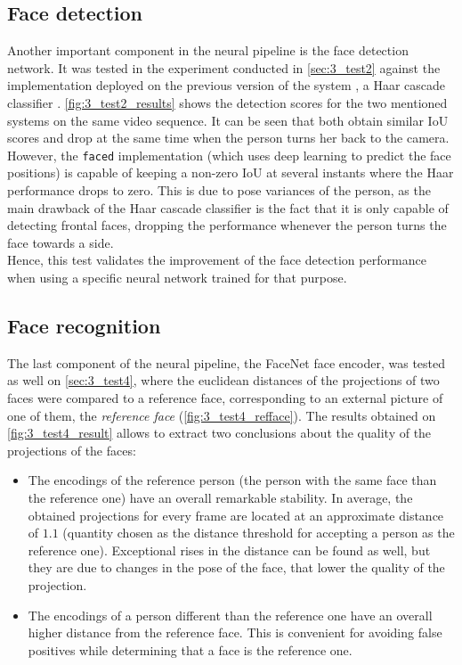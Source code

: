 \subsection{Face detection}
Another important component in the neural pipeline is the face detection network. It was tested in the experiment conducted in \autoref{sec:3_test2} against the implementation deployed on the previous version of the system \cite{tfg}, a Haar cascade classifier \cite{violajones}. \autoref{fig:3_test2_results} shows the detection scores for the two mentioned systems on the same video sequence. It can be seen that both obtain similar IoU scores and drop at the same time when the person turns her back to the camera. However, the \texttt{faced} implementation (which uses deep learning to predict the face positions) is capable of keeping a non-zero IoU at several instants where the Haar performance drops to zero. This is due to pose variances of the person, as the main drawback of the Haar cascade classifier is the fact that it is only capable of detecting frontal faces, dropping the performance whenever the person turns the face towards a side.\\

Hence, this test validates the improvement of the face detection performance when using a specific neural network trained for that purpose.

\subsection{Face recognition}
The last component of the neural pipeline, the FaceNet face encoder, was tested as well on \autoref{sec:3_test4}, where the euclidean distances of the projections of two faces were compared to a reference face, corresponding to an external picture of one of them, the \textit{reference face} (\autoref{fig:3_test4_refface}). The results obtained on \autoref{fig:3_test4_result} allows to extract two conclusions about the quality of the projections of the faces:

\begin{itemize}
	\item The encodings of the reference person (the person with the same face than the reference one) have an overall remarkable stability. In average, the obtained projections for every frame are located at an approximate distance of $1.1$ (quantity chosen as the distance threshold for accepting a person as the reference one). Exceptional rises in the distance can be found as well, but they are due to changes in the pose of the face, that lower the quality of the projection.\\
	\item The encodings of a person different than the reference one have an overall higher distance from the reference face. This is convenient for avoiding false positives while determining that a face is the reference one.
\end{itemize} 

